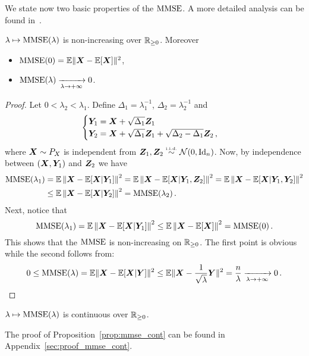 \documentclass[12pt,nocut]{article}
\begin{document}
We state now two basic properties of the ${{\rm MMSE}}$. A more detailed analysis can be found in~\cite{guo2011estimation,wu2012functional}.
\begin{proposition}\label{prop:mmse_dec}
	$\lambda \mapsto {{\rm MMSE}}(\lambda)$ is non-increasing over $\mathbb{R}_{\geq 0}$. 
	Moreover
	\begin{itemize}
		\item ${{\rm MMSE}}(0) = \mathbb{E}\|{\boldsymbol X} - \mathbb{E}[{\boldsymbol X}]\|^2$,
		\item ${{\rm MMSE}}(\lambda) \xrightarrow[\lambda \to +\infty]{} 0$.
	\end{itemize}
\end{proposition}
\begin{proof}
Let $0 < \lambda_2 < \lambda_1$. Define $\Delta_1 = \lambda_1^{-1}$, $\Delta_2 = \lambda_2^{-1}$ and
	$$
	\begin{cases}
		{\boldsymbol Y}_1 = {\boldsymbol X} + \sqrt{\Delta_1} {\boldsymbol Z}_1 \\
		{\boldsymbol Y}_2 = {\boldsymbol X} + \sqrt{\Delta_1} {\boldsymbol Z}_1  + \sqrt{\Delta_2 - \Delta_1} {\boldsymbol Z}_2 \,,
	\end{cases}
	$$
	where ${\boldsymbol X} \sim P_X$ is independent from ${\boldsymbol Z}_1,{\boldsymbol Z}_2 \overset{\text{\tiny i.i.d.}}{\sim} \mathcal{N}(0,{\rm Id}_n)$. Now, by independence between $({\boldsymbol X},{\boldsymbol Y}_1)$ and ${\boldsymbol Z}_2$ we have
	\begin{align*}
		{{\rm MMSE}}(\lambda_1) 
		&= \mathbb{E} \left\| {\boldsymbol X} - \mathbb{E} [{\boldsymbol X} | {\boldsymbol Y}_1] \right\|^2
		= \mathbb{E} \left\| {\boldsymbol X} - \mathbb{E} [{\boldsymbol X} | {\boldsymbol Y}_1, {\boldsymbol Z}_2] \right\|^2
		= \mathbb{E} \left\| {\boldsymbol X} - \mathbb{E} [{\boldsymbol X} | {\boldsymbol Y}_1, {\boldsymbol Y}_2] \right\|^2
		\\
		&\leq \mathbb{E} \left\| {\boldsymbol X} - \mathbb{E} [{\boldsymbol X} | {\boldsymbol Y}_2] \right\|^2
		= {{\rm MMSE}}(\lambda_2) \,.
	\end{align*}
	Next, notice that
	\begin{equation}\label{eq:upper_bound_mmse}
		{{\rm MMSE}}(\lambda_1)
		= \mathbb{E} \left\| {\boldsymbol X} - \mathbb{E} [{\boldsymbol X} | {\boldsymbol Y}_1] \right\|^2
		\leq \mathbb{E} \left\| {\boldsymbol X} - \mathbb{E} [{\boldsymbol X}] \right\|^2 = {{\rm MMSE}}(0)\,.
	\end{equation}
	This shows that the ${{\rm MMSE}}$ is non-increasing on $\mathbb{R}_{\geq 0}$. 
	The first point is obvious while the second follows from:
	$$
	0 \leq {{\rm MMSE}}(\lambda)
	= \mathbb{E} \| {\boldsymbol X} - \mathbb{E}[{\boldsymbol X}| {\boldsymbol Y}]\|^2
	\leq \mathbb{E} \| {\boldsymbol X} - \frac{1}{\sqrt{\lambda}} {\boldsymbol Y}\|^2 = \frac{n}{\lambda} \xrightarrow[\lambda \to +\infty]{} 0 \,.
	$$
\end{proof}
\begin{proposition}\label{prop:mmse_cont}
	$\lambda \mapsto {{\rm MMSE}}(\lambda)$ is continuous over $\mathbb{R}_{\geq 0}$.
\end{proposition}
The proof of Proposition~\ref{prop:mmse_cont} can be found in Appendix~\ref{sec:proof_mmse_cont}.
\\
\end{document}
